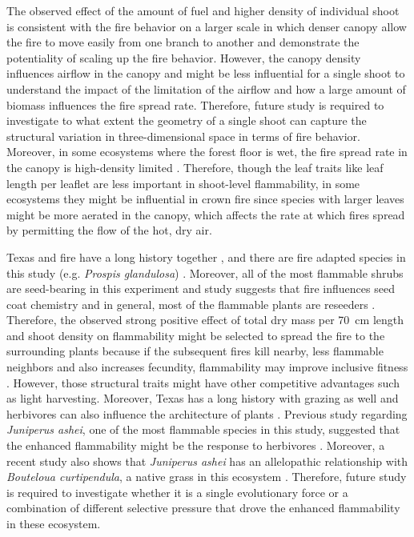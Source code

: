 \documentclass[12pt]{report}
\begin{document}
The observed effect of the amount of fuel and higher density of individual shoot is consistent with the fire behavior on a larger scale in which denser canopy allow the fire to move easily from one branch to another \citep{bond1996fire} and demonstrate the potentiality of scaling up the fire behavior. However, the canopy density influences airflow in the canopy \citep{cionco1978analysis} and might be less influential for a single shoot to understand the impact of the limitation of the airflow and how a large amount of biomass influences the fire spread rate. Therefore, future study is required to investigate to what extent the geometry of a single shoot can capture the structural variation in three-dimensional space in terms of fire behavior. Moreover, in some ecosystems where the forest floor is wet, the fire spread rate in the canopy is high-density limited  \citep{ray2005micrometeorological}. Therefore, though the leaf traits like leaf length per leaflet are less important in shoot-level flammability, in some ecosystems they might be influential in crown fire since species with larger leaves might be more aerated in the canopy, which affects the rate at which fires spread by permitting the flow of the hot, dry air. 

Texas and fire have a long history together \citep{moir1982firehistory, stambaugh2011firehistory,stambaugh2014historicalfirehistory,smeins2005historyoffire1}, and there are fire adapted species in this study (e.g. \emph{Prospis glandulosa}) \citep{glandulosahoney,wright1976effect}. Moreover, all of the most flammable shrubs are seed-bearing in this experiment and study suggests that fire influences seed coat chemistry \citep{mcinnes2022doesseedcoatchemistry} and in general, most of the flammable plants are reseeders \citep{midgley2011pushingreseeders}. Therefore,  the observed strong positive effect of total dry mass per 70 \,cm length and shoot density on flammability might be selected to spread the fire to the surrounding plants because if the subsequent fires kill nearby, less flammable neighbors and also increases fecundity, flammability may improve inclusive fitness \citep{bond1995kill}. However, those structural traits might have other competitive advantages such as light harvesting. Moreover, Texas has a long history with grazing as well and herbivores can also influence the architecture of plants \citep{danell1994browseeffects}. Previous study regarding \emph{Juniperus ashei}, one of the most flammable species in this study, suggested that the enhanced flammability might be the response to herbivores \citep{owens1998seasonal}. Moreover, a recent study also shows that \emph{Juniperus ashei} has an allelopathic relationship with \emph{Bouteloua curtipendula}, a native grass in this ecosystem \citep{young2009assessmentallelopathy}. Therefore, future study is required to investigate whether it is a single evolutionary force or a combination of different selective pressure that drove the enhanced flammability in these ecosystem.
\end{document}
